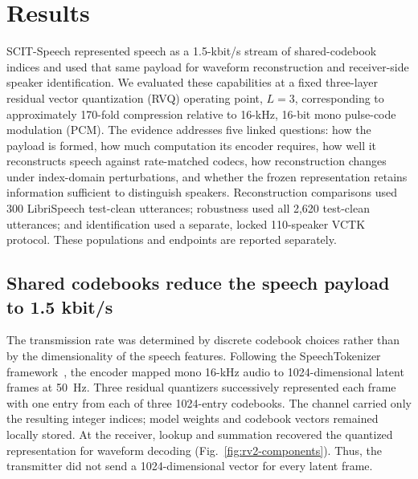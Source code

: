 \section{Results}
\label{sec:results-v2}
SCIT-Speech represented speech as a 1.5-kbit/s stream of shared-codebook indices and used that same payload for waveform reconstruction and receiver-side speaker identification. We evaluated these capabilities at a fixed three-layer residual vector quantization (RVQ) operating point, $L=3$, corresponding to approximately 170-fold compression relative to 16-kHz, 16-bit mono pulse-code modulation (PCM). The evidence addresses five linked questions: how the payload is formed, how much computation its encoder requires, how well it reconstructs speech against rate-matched codecs, how reconstruction changes under index-domain perturbations, and whether the frozen representation retains information sufficient to distinguish speakers. Reconstruction comparisons used 300 LibriSpeech test-clean utterances; robustness used all 2,620 test-clean utterances; and identification used a separate, locked 110-speaker VCTK protocol. These populations and endpoints are reported separately.

\subsection{Shared codebooks reduce the speech payload to 1.5 kbit/s}
\label{sec:rv2-payload}
The transmission rate was determined by discrete codebook choices rather than by the dimensionality of the speech features. Following the SpeechTokenizer framework~\cite{speechtokenizer}, the encoder mapped mono 16-kHz audio to 1024-dimensional latent frames at 50~Hz. Three residual quantizers successively represented each frame with one entry from each of three 1024-entry codebooks. The channel carried only the resulting integer indices; model weights and codebook vectors remained locally stored. At the receiver, lookup and summation recovered the quantized representation for waveform decoding (Fig.~\ref{fig:rv2-components}). Thus, the transmitter did not send a 1024-dimensional vector for every latent frame.

